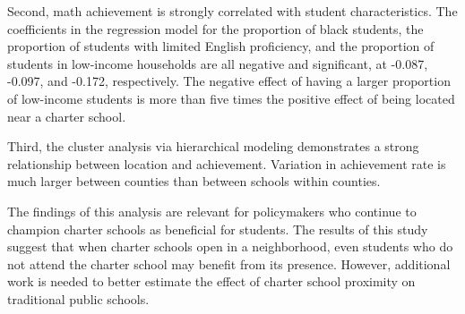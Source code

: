 \documentclass[11pt]{article}
\begin{document}
Second, math achievement is strongly correlated with student characteristics.  The coefficients in the regression model for the proportion of black students, the proportion of students with limited English proficiency, and the proportion of students in low-income households are all negative and significant, at -0.087, -0.097, and -0.172, respectively.  The negative effect of having a larger proportion of low-income students is more than five times the positive effect of being located near a charter school.  

Third, the cluster analysis via hierarchical modeling demonstrates a strong relationship between location and achievement.  Variation in achievement rate is much larger between counties than between schools within counties.

The findings of this analysis are relevant for policymakers who continue to champion charter schools as beneficial for students.  The results of this study suggest that when charter schools open in a neighborhood, even students who do not attend the charter school may benefit from its presence.  However, additional work is needed to better estimate the effect of charter school proximity on traditional public schools.
\end{document}
